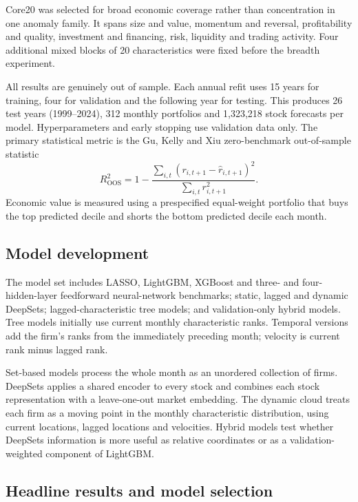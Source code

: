 \documentclass[11pt,a4paper]{article}
\begin{document}
Core20 was selected for broad economic coverage rather than concentration in one anomaly family. It spans size and value, momentum and reversal, profitability and quality, investment and financing, risk, liquidity and trading activity. Four additional mixed blocks of 20 characteristics were fixed before the breadth experiment.

All results are genuinely out of sample. Each annual refit uses 15 years for training, four for validation and the following year for testing. This produces 26 test years (1999--2024), 312 monthly portfolios and 1,323,218 stock forecasts per model. Hyperparameters and early stopping use validation data only. The primary statistical metric is the Gu, Kelly and Xiu zero-benchmark out-of-sample statistic
\[
R^2_{\mathrm{OOS}}=1-\frac{\sum_{i,t}(r_{i,t+1}-\widehat r_{i,t+1})^2}{\sum_{i,t}r_{i,t+1}^2}.
\]
Economic value is measured using a prespecified equal-weight portfolio that buys the top predicted decile and shorts the bottom predicted decile each month.

\subsection*{Model development}

The model set includes LASSO, LightGBM, XGBoost and three- and four-hidden-layer feedforward neural-network benchmarks; static, lagged and dynamic DeepSets; lagged-characteristic tree models; and validation-only hybrid models. Tree models initially use current monthly characteristic ranks. Temporal versions add the firm's ranks from the immediately preceding month; velocity is current rank minus lagged rank.

Set-based models process the whole month as an unordered collection of firms. DeepSets applies a shared encoder to every stock and combines each stock representation with a leave-one-out market embedding. The dynamic cloud treats each firm as a moving point in the monthly characteristic distribution, using current locations, lagged locations and velocities. Hybrid models test whether DeepSets information is more useful as relative coordinates or as a validation-weighted component of LightGBM.

\subsection*{Headline results and model selection}
\end{document}

